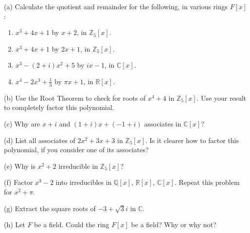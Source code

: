 \begin{problem}[Warmup]{(a)}
    Calculate the quotient and remainder for the following, in various rings $F[x]$:
    \begin{enumerate}
        \item[(a)] $x^3 + 4x + 1$ by $x + 2$, in $\mathbb{Z}_5[x]$.
        \item[(b)] $x^3 + 4x + 1$ by $2x + 1$, in $\mathbb{Z}_5[x]$.
        \item[(c)] $x^3 - (2 + i)x^2 + 5$ by $ix - 1$, in $\mathbb{C}[x]$.
        \item[(d)] $x^4 - 2x^3 + \frac{1}{3}$ by $\pi x + 1$, in $\mathbb{R}[x]$.
    \end{enumerate}
\end{problem}
\unsolved

\begin{problem}[Warmup]{(b)}
    Use the Root Theorem to check for roots of $x^4 + 4$ in $\mathbb{Z}_5[x]$. Use your result to completely factor this polynomial.
\end{problem}
\unsolved

\begin{problem}[Warmup]{(c)}
    Why are $x + i$ and $(1 + i)x + (-1 + i)$ associates in $\mathbb{C}[x]$?
\end{problem}
\unsolved

\begin{problem}[Warmup]{(d)}
    List all associates of $2x^2 + 3x + 3$ in $\mathbb{Z}_5[x]$. Is it clearer how to factor this polynomial, if you consider one of its associates?
\end{problem}
\unsolved

\begin{problem}[Warmup]{(e)}
    Why is $x^2 + 2$ irreducible in $\mathbb{Z}_5[x]$?
\end{problem}
\unsolved

\begin{problem}[Warmup]{(f)}
    Factor $x^3 - 2$ into irreducibles in $\mathbb{Q}[x]$, $\mathbb{R}[x]$, $\mathbb{C}[x]$. Repeat this problem for $x^2 + \pi$.
\end{problem}
\unsolved

\begin{problem}[Warmup]{(g)}
    Extract the square roots of $-3 + \sqrt{3}i$ in $\mathbb{C}$.
\end{problem}
\unsolved

\begin{problem}[Warmup]{(h)}
    Let $F$ be a field. Could the ring $F[x]$ be a field? Why or why not?
\end{problem}
\unsolved

